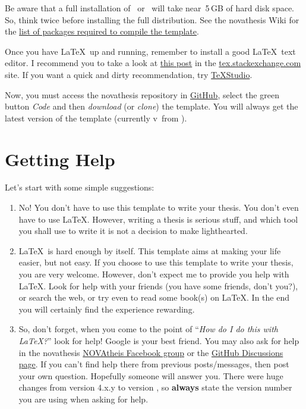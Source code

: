 Be aware that a full installation of \MikTeX\ or \TeXLive\ will take near~5\,GB of hard disk space.  So, think twice before installing the full distribution.  See the \gls{novathesis} Wiki for the \href{https://github.com/joaomlourenco/novathesis/wiki/installing-latex#minimal-installation-in-any-of-the-systems-above}{list of packages required to compile the template}.

Once you have \LaTeX\ up and running, remember to install a good \LaTeX\ text editor.  I recommend you to take a look at  \href{https://tex.stackexchange.com/questions/339/latex-editors-ides}{this post} in the \url{tex.stackexchange.com} site.  If you want a quick and dirty recommendation, try \href{https://www.texstudio.org/}{TeXStudio}.

Now, you must access the \gls{novathesis} repository in \href{https://github.com/joaomlourenco/novathesis}{GitHub}, select the green button \emph{Code} and then \emph{download} (or \emph{clone}) the template.  You will always get the latest version of the template (currently v\novathesisversion\ from \novathesisdate).


\section{Getting Help}
\label{sec:getting_help}
Let's start with some simple suggestions:

\begin{enumerate}
  \item No! You don't have to use this template to write your thesis.  You don't even have to use \LaTeX.  However, writing a thesis is serious stuff, and which tool you shall use to write it is not a decision to make lighthearted.
  \item \LaTeX\ is hard enough by itself.  This template aims at making your life easier, but not easy. If you choose to use this template to write your thesis, you are very welcome.  However, don't expect me to provide you help with \LaTeX.  Look for help with your friends (you have some friends, don't you?), or search the web, or try even to read some book(s) on \LaTeX. In the end you will certainly find the experience rewarding.
  \item So, don't forget, when you come to the point of “\emph{How do I do this with \LaTeX?}” look for help!  Google is your best friend. You may also ask for help in the \gls{novathesis} \href{https://www.facebook.com/groups/novathesis}{NOVAtheis Facebook group} or the \href{https://github.com/joaomlourenco/novathesis/discussions}{GitHub Discussions page}.  If you can't find help there from previous posts/messages, then post your own question. Hopefully someone will answer you. There were huge changes from version 4.x.y to version \novathesisversion, so \textbf{always} state the version number you are using when asking for help.
\end{enumerate}

